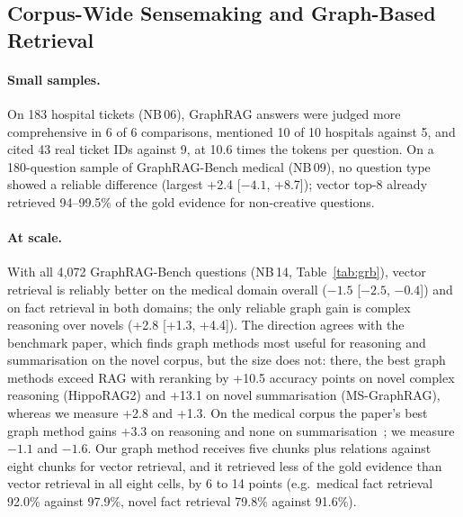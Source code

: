 \documentclass[11pt,a4paper]{article}
\newcommand{\nb}[1]{NB\,#1}
\begin{document}
\subsection{Corpus-Wide Sensemaking and Graph-Based Retrieval}
\label{sec:sensemaking}

\paragraph{Small samples.} On 183 hospital tickets (\nb{06}), GraphRAG answers were judged more comprehensive in
6 of 6 comparisons, mentioned 10 of 10 hospitals against 5, and cited 43 real ticket IDs against 9, at 10.6 times
the tokens per question. On a 180-question sample of GraphRAG-Bench medical (\nb{09}), no question type showed a
reliable difference (largest +2.4 [$-4.1$, +8.7]); vector top-8 already retrieved 94--99.5\% of the gold evidence
for non-creative questions.

\paragraph{At scale.} With all 4{,}072 GraphRAG-Bench questions (\nb{14}, Table~\ref{tab:grb}), vector retrieval is
reliably better on the medical domain overall ($-1.5$ [$-2.5$, $-0.4$]) and on fact retrieval in both domains;
the only reliable graph gain is complex reasoning over novels (+2.8 [+1.3, +4.4]). The direction agrees with the
benchmark paper, which finds graph methods most useful for reasoning and summarisation on the novel corpus, but the
size does not: there, the best graph methods exceed RAG with reranking by +10.5 accuracy points on novel complex
reasoning (HippoRAG2) and +13.1 on novel summarisation (MS-GraphRAG), whereas we measure +2.8 and +1.3. On the medical
corpus the paper's best graph method gains +3.3 on reasoning and none on summarisation~\cite{xiang2025graphragbench};
we measure $-1.1$ and $-1.6$. Our graph method receives five chunks plus relations against eight chunks for vector
retrieval, and it retrieved less of the gold evidence than vector retrieval in all eight cells, by 6 to 14 points
(e.g.\ medical fact retrieval 92.0\% against 97.9\%, novel fact retrieval 79.8\% against 91.6\%).
\end{document}
